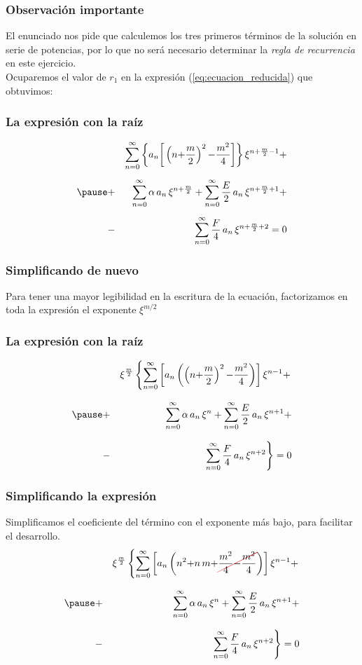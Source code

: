 \documentclass[12pt]{beamer}
\newcommand{\Cancel}[2][black]{{\color{#1}\cancel{\color{black}#2}}}
\begin{document}
\begin{frame}
\frametitle{Observación importante}
El enunciado nos pide que calculemos los tres primeros términos de la solución en serie de potencias, por lo que no será necesario determinar la \emph{regla de recurrencia} en este ejercicio.
\\
\bigskip
Ocuparemos el valor de $r_{1}$ en la expresión (\ref{eq:ecuacion_reducida}) que obtuvimos:
\end{frame}
\begin{frame}
\frametitle{La expresión con la raíz}
\vspace{-1cm}
\begin{eqnarray*}
&{}& \sum_{n=0}^{\infty} \bigg\{ a_{n} \bigg[ \left(n {+} \dfrac{m}{2} \right)^{2} {-} \dfrac{m^{2}}{4} \bigg] \bigg\} \, \xi^{n+\frac{m}{2}-1} + \\[0.5em] \pause
&+& \sum_{n=0}^{\infty} \alpha \, a_{n} \, \xi^{n+\frac{m}{2}} + \sum_{n=0}^{\infty} \dfrac{E}{2} \, a_{n} \, \xi^{n+\frac{m}{2}+1} + \\[0.5em] 
&-& \sum_{n=0}^{\infty} \dfrac{F}{4} \, a_{n} \, \xi^{n+\frac{m}{2}+2} = 0
\end{eqnarray*}
\end{frame}
\begin{frame}
\frametitle{Simplificando de nuevo}
Para tener una mayor legibilidad en la escritura de la ecuación, factorizamos en toda la expresión el exponente $\xi^{m/2}$
\end{frame}
\begin{frame}
\frametitle{La expresión con la raíz}
\vspace{-1cm}
\begin{eqnarray*}
&{}& \xi^{\frac{m}{2}} \left\{ \sum_{n=0}^{\infty} \left[ a_{n} \left( \left(n {+} \dfrac{m}{2} \right)^{2} {-} \dfrac{m^{2}}{4} \right) \right] \xi^{n-1} +  \right. \\[0.75em] \pause
&+& \sum_{n=0}^{\infty} \alpha \, a_{n} \, \xi^{n} + \sum_{n=0}^{\infty} \dfrac{E}{2} \, a_{n} \, \xi^{n+1} + \\[0.75em] 
&-& \left. \sum_{n=0}^{\infty} \dfrac{F}{4} \, a_{n} \, \xi^{n+2} \right\} = 0
\end{eqnarray*}
\end{frame}
\begin{frame}
\frametitle{Simplificando la expresión}
Simplificamos el coeficiente del término con el exponente más bajo, para facilitar el desarrollo.
\pause
\begin{eqnarray*}
&{}& \xi^{\frac{m}{2}} \left\{  \sum_{n=0}^{\infty} \left[ a_{n} \left( n^{2} {+} n \, m {+} \Cancel[red]{\dfrac{m^{2}}{4} {-} \dfrac{m^{2}}{4}} \right) \right] \xi^{n-1} +  \right. \\[0.75em] \pause
&+& \sum_{n=0}^{\infty} \alpha \, a_{n} \, \xi^{n} + \sum_{n=0}^{\infty} \dfrac{E}{2} \, a_{n} \, \xi^{n+1} + \\[0.75em] 
&-& \left. \sum_{n=0}^{\infty} \dfrac{F}{4} \, a_{n} \, \xi^{n+2} \right\} = 0
\end{eqnarray*}
\end{frame}
\end{document}
